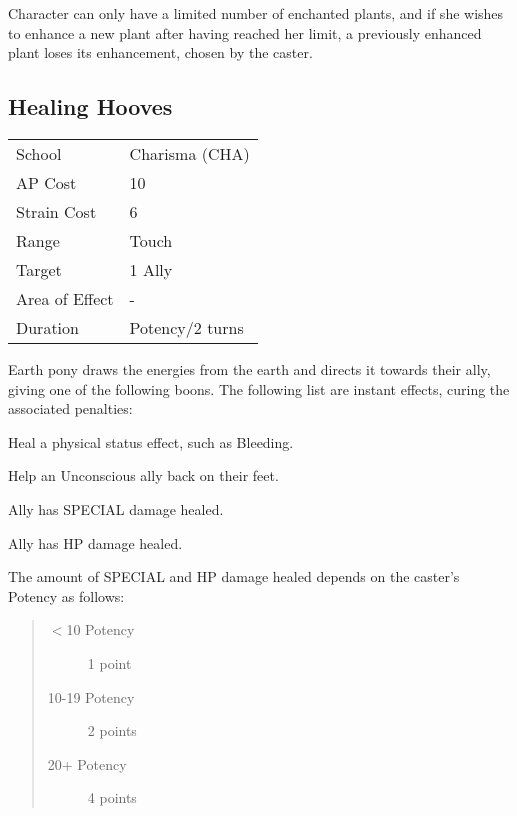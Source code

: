 \documentclass[11pt,a4paper,twocolumn]{book}
\begin{document}
Character can only have a limited number of enchanted plants, and if she wishes to enhance a new plant after having reached her limit, a previously enhanced plant loses its enhancement, chosen by the caster.


\subsection*{Healing Hooves}
{
	\begin{tabu} to 75mm{| X[l,4] | X[l,7] |}
		\hline
		School 			& Charisma (CHA) 	\\
		AP Cost	      	& 10 				\\
		Strain Cost     & 6 				\\
		Range     		& Touch 				\\
		Target      	& 1 Ally 			\\
		Area of Effect  & - 	 			\\
		Duration     	& Potency/2 turns 	\\ \hline
	\end{tabu}
	
}

\medskip

Earth pony draws the energies from the earth and directs it towards their ally, giving one of the following boons. The following list are instant effects, curing the associated penalties:

\medskip
\begin{compactitem}
	\item Heal a physical status effect, such as Bleeding.
	\item Help an Unconscious ally back on their feet.
	\item Ally has SPECIAL damage healed.
	\item Ally has HP damage healed.
\end{compactitem}
\medskip

The amount of SPECIAL and HP damage healed depends on the caster's Potency as follows:

\begin{quote}
	\begin{description}
		\item[$<$10 Potency] 	1 point
		\item[10-19 Potency] 	2 points
		\item[20+ Potency] 	    4 points
	\end{description}
\end{quote}
\end{document}
